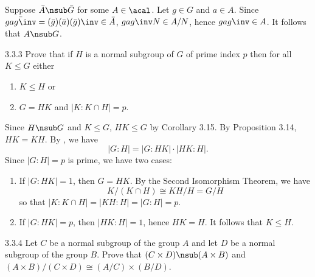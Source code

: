 \begin{sol}[spsol]
\begin{enumerate}
        \leftimp Suppose $\bar A \nsub \bar G$ for some $A \in \acal$.
        Let $g \in G$ and $a \in A$.
        Since $\bar{gag\inv} = (\bar g)(\bar a)(\bar g)\inv \in \bar A$, $gag\inv N \in A/N$, hence $gag\inv \in A$.
        It follows that $A \nsub G$. \qedhere
    \end{enumerate}
\end{sol}

\begin{exercise}{3.3.3}
    Prove that if $H$ is a normal subgroup of $G$ of prime index $p$ then for all $K \leq G$ either
    \begin{enumerate}
        \item[(i)] $K \leq H$ or
        \item[(ii)] $G = HK$ and $|K : K \cap H| = p$.
    \end{enumerate}
\end{exercise}

\begin{sol}
    Since $H \nsub G$ and $K \leq G$, $HK \leq G$ by Corollary 3.15.
	By Proposition 3.14, $HK = KH$.
	By , we have
    \[
    	|G : H| = |G : HK| \cdot |HK : H|.
    \]
    Since $|G : H| = p$ is prime, we have two cases:
    \begin{enumerate}
        \item If $|G : HK| = 1$, then $G = HK$.
	    By the Second Isomorphism Theorem, we have
        \[
        	K/(K \cap H) \cong KH/H = G/H
        \]
        so that $|K : K \cap H| = |KH : H| = |G : H| = p$.
        \item If $|G : HK| = p$, then $|HK : H| = 1$, hence $HK = H$.
	It follows that $K \leq H$. \qedhere
    \end{enumerate}
\end{sol}

\begin{exercise}{3.3.4}
    Let $C$ be a normal subgroup of the group $A$ and let $D$ be a normal subgroup of the group $B$.
	Prove that $(C \times D) \nsub (A \times B)$ and $(A \times B)/(C \times D) \cong (A/C) \times (B/D)$.
\end{exercise}

